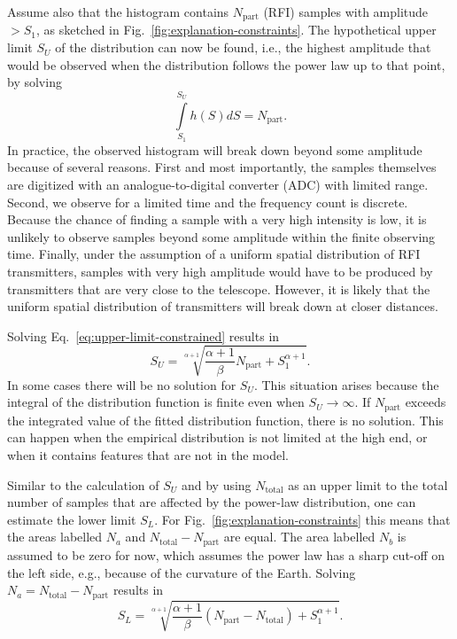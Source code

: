 \documentclass[useAMS,usenatbib]{mn2e}
\begin{document}
Assume also that the histogram contains $N_\textrm{part}$ (RFI) samples with amplitude $> S_1$, as sketched in Fig.~\ref{fig:explanation-constraints}. The hypothetical upper limit $S_U$ of the distribution can now be found, i.e., the highest amplitude that would be observed when the distribution follows the power law up to that point, by solving
\begin{equation} \label{eq:upper-limit-constrained}
 \int\limits_{S_1}^{S_U} h(S) dS = N_\textrm{part}.
\end{equation}
In practice, the observed histogram will break down beyond some amplitude because of several reasons. First and most importantly, the samples themselves are digitized with an analogue-to-digital converter (ADC) with limited range. Second, we observe for a limited time and the frequency count is discrete. Because the chance of finding a sample with a very high intensity is low, it is unlikely to observe samples beyond some amplitude within the finite observing time. Finally, under the assumption of a uniform spatial distribution of RFI transmitters, samples with very high amplitude would have to be produced by transmitters that are very close to the telescope. However, it is likely that the uniform spatial distribution of transmitters will break down at closer distances.

Solving Eq.~\eqref{eq:upper-limit-constrained} results in
\begin{equation} \label{eq:upper-limit}
S_U = \sqrt[\alpha+1]{\frac{\alpha+1}{\beta} N_\textrm{part} + S_1^{\alpha+1}}.
\end{equation}
In some cases there will be no solution for $S_U$. This situation arises because the integral of the distribution function is finite even when $S_U \rightarrow \infty$. If $N_\textrm{part}$ exceeds the integrated value of the fitted distribution function, there is no solution. This can happen when the empirical distribution is not limited at the high end, or when it contains features that are not in the model.

Similar to the calculation of $S_U$ and by using $N_\textrm{total}$ as an upper limit to the total number of samples that are affected by the power-law distribution, one can estimate the lower limit $S_L$. For Fig.~\ref{fig:explanation-constraints} this means that the areas labelled $N_a$ and $N_\textrm{total}-N_\textrm{part}$ are equal. The area labelled $N_b$ is assumed to be zero for now, which assumes the power law has a sharp cut-off on the left side, e.g., because of the curvature of the Earth. Solving $N_a = N_\textrm{total}-N_\textrm{part}$ results in
\begin{equation} \label{eq:lower-limit-1}
S_L = \sqrt[\alpha+1]{\frac{\alpha+1}{\beta}\left(N_\textrm{part} - N_\textrm{total} \right) + S_1^{\alpha+1}}.
\end{equation}
\end{document}
